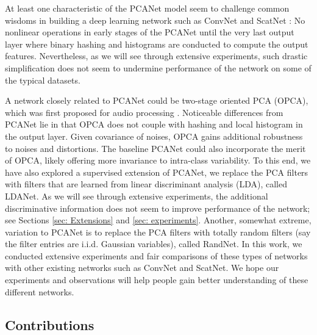 \documentclass[10pt,journal,compsoc]{IEEEtran}
\begin{document}
At least one characteristic of the PCANet model seem to challenge common wisdoms in building a deep learning network such as ConvNet \cite{LeCun1998, Jarrett2009, Krizhevsky2012} and ScatNet \cite{Bruna2013,Sifre2013}: No nonlinear operations in early stages of the PCANet until the very last output layer where binary hashing and histograms are conducted to compute the output features. Nevertheless, as we will see through extensive experiments, such drastic simplification does not seem to undermine performance of the network on some of the typical datasets.


A network closely related to PCANet could be two-stage oriented PCA (OPCA), which was first proposed for audio processing \cite{Burges2003}. Noticeable differences from PCANet lie in that OPCA does not couple with hashing and local histogram in the output layer. Given covariance of noises, OPCA gains additional robustness to noises and distortions. The baseline PCANet could also incorporate the merit of OPCA, likely offering more invariance to intra-class variability. To this end, we have also explored a supervised extension of PCANet, we replace the PCA filters with filters that are learned from linear discriminant analysis (LDA), called LDANet. As we will see through extensive experiments, the additional discriminative information does not seem to improve performance of the network; see Sections \ref{sec: Extensions} and \ref{sec: experiments}. Another, somewhat extreme, variation to PCANet is to replace the PCA filters with totally random filters (say the filter entries are i.i.d. Gaussian variables), called RandNet. In this work, we conducted extensive experiments and fair comparisons of these types of networks with other existing networks such as ConvNet and ScatNet. We hope our experiments and observations will help people gain better understanding of these different networks.


\subsection{Contributions}
\end{document}

